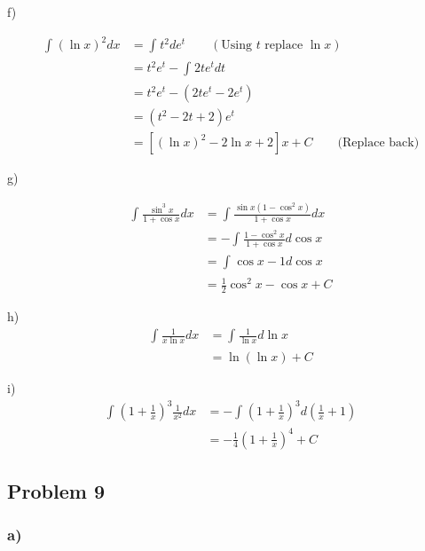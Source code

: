 \documentclass[letterpaper, 11pt]{article}
\newcommand{\1}{\mathds{1}}	%
\theoremstyle{definition}
\begin{document}
  f)

  \begin{align*}
    \int_{}^{}(\ln x)^{2}dx & = \int_{}^{}t ^{2}de ^{t} \qquad (\text{Using $t$ replace $\ln x$}) \\
                            & =t ^{2}e ^{t} - \int_{}^{}2te ^{t}dt                                \\
                            & =t ^{2}e ^{t} - (2te ^{t} - 2e ^{t})                                \\
                            & =(t ^{2}-2t+2)e ^{t}                                                \\
                            & = [(\ln x)^{2}-2 \ln x + 2]x + C \qquad \text{(Replace back)}
  \end{align*}

  g)

  \begin{align*}
    \int_{}^{}\frac{\sin ^{3}x}{1+ \cos x}dx & = \int_{}^{}\frac{\sin x (1- \cos ^{2}x)}{1+\cos x}dx \\
                                             & = -\int_{}^{}\frac{1-\cos ^{2} x}{1+ \cos x} d \cos x \\
                                             & = \int_{}^{}\cos x - 1 d \cos x                       \\
                                             & = \frac{1}{2}\cos ^{2} x - \cos x + C
  \end{align*}


  h)
  \begin{align*}
    \int_{}^{}\frac{1}{x \ln x}dx & = \int_{}^{}\frac{1}{\ln x}d \ln x \\
                                  & =\ln(\ln x) +C
  \end{align*}

  i)
  \begin{align*}
    \int_{}^{}(1+\frac{1}{x})^{3}\frac{1}{x ^{2}} dx & = -\int_{}^{}(1 + \frac{1}{x})^{3}d(\frac{1}{x} + 1) \\
                                                     & = -\frac{1}{4} (1+\frac{1}{x})^{4} + C
  \end{align*}

  \subsection*{Problem 9}

  \subsubsection*{a)}
\end{document}
